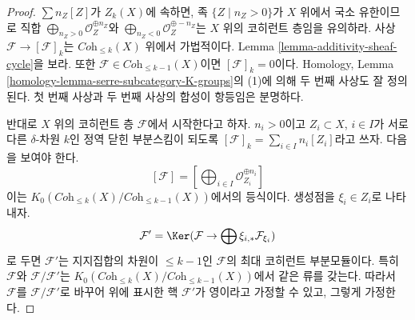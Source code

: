 \begin{proof}
$\sum n_Z[Z]$가 $Z_k(X)$에 속하면, 족
$\{Z \mid n_Z > 0\}$가 $X$ 위에서 국소 유한이므로 직합
$\bigoplus\nolimits_{n_Z > 0} \mathcal{O}_Z^{\oplus n_Z}$와
$\bigoplus\nolimits_{n_Z < 0} \mathcal{O}_Z^{\oplus -n_Z}$는 $X$ 위의
코히런트 층임을 유의하라. 사상
$\mathcal{F} \to [\mathcal{F}]_k$는 $\textit{Coh}_{\leq k}(X)$ 위에서
가법적이다. Lemma \ref{lemma-additivity-sheaf-cycle}을 보라. 또한
$\mathcal{F} \in \textit{Coh}_{\leq k - 1}(X)$이면
$[\mathcal{F}]_k = 0$이다. Homology, Lemma
\ref{homology-lemma-serre-subcategory-K-groups}의 (1)에 의해 두 번째
사상도 잘 정의된다. 첫 번째 사상과 두 번째 사상의 합성이 항등임은
분명하다.

\medskip\noindent
반대로 $X$ 위의 코히런트 층 $\mathcal{F}$에서 시작한다고 하자.
$n_i > 0$이고 $Z_i \subset X$, $i \in I$가 서로 다른
$\delta$-차원 $k$인 정역 닫힌 부분스킴이 되도록
$[\mathcal{F}]_k = \sum_{i \in I} n_i[Z_i]$라고 쓰자. 다음을 보여야 한다.
$$
[\mathcal{F}] = [\bigoplus\nolimits_{i \in I} \mathcal{O}_{Z_i}^{\oplus n_i}]
$$
이는 $K_0(\textit{Coh}_{\leq k}(X)/\textit{Coh}_{\leq k - 1}(X))$에서의
등식이다. 생성점을 $\xi_i \in Z_i$로 나타내자.
$$
\mathcal{F}' = \Ker(\mathcal{F} \to \bigoplus \xi_{i, *}\mathcal{F}_{\xi_i})
$$
로 두면 $\mathcal{F}'$는 지지집합의 차원이 $\leq k - 1$인
$\mathcal{F}$의 최대 코히런트 부분모듈이다. 특히 $\mathcal{F}$와
$\mathcal{F}/\mathcal{F}'$는
$K_0(\textit{Coh}_{\leq k}(X)/\textit{Coh}_{\leq k - 1}(X))$에서 같은
류를 갖는다. 따라서 $\mathcal{F}$를 $\mathcal{F}/\mathcal{F}'$로
바꾸어 위에 표시한 핵 $\mathcal{F}'$가 영이라고 가정할 수 있고,
그렇게 가정한다.


\end{proof}
